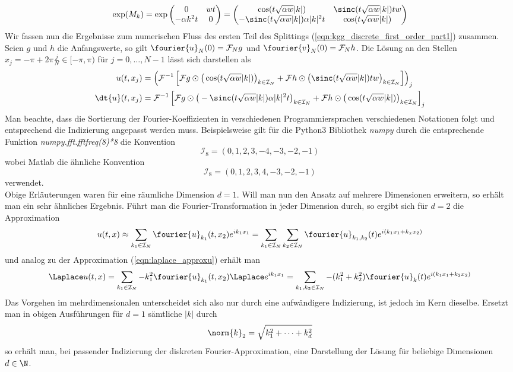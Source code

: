 \[\exp(M_k)=\exp\begin{pmatrix}0 & wt\\ -\alpha k^2t & 0\end{pmatrix}=
\begin{pmatrix}\cos(t\sqrt{\alpha w}|k|) & \sinc(t\sqrt{\alpha w}|k|)tw\\-\sinc(t\sqrt{\alpha w}|k|)\alpha |k|^2t & \cos(t\sqrt{\alpha w}|k|)\end{pmatrix}\]
Wir fassen nun die Ergebnisse zum numerischen Fluss des ersten Teil des Splittings (\ref{eqn:kgg_discrete_first_order_part1}) zusammen.\\
Seien $g$ und $h$ die Anfangswerte, so gilt $\fourier{u}_N(0)=\mathcal{F}_Ng$ und $\fourier{v}_N(0)=\mathcal{F}_Nh$. Die Lösung an den Stellen $x_j=-\pi+2\pi\frac{j}{N}\in [-\pi,\pi)$ für $j=0,\dots,N-1$ lässt sich darstellen als
\begin{align*}
u(t,x_j)&=\left(\mathcal{F}^{-1}\left[\mathcal{F}g\odot \big(\cos(t\sqrt{\alpha w}|k|)\big)_{k\in\mathcal{I}_N} + \mathcal{F}h\odot \big(\sinc(t\sqrt{\alpha w}|k|)tw\big)_{k\in\mathcal{I}_N}\right]\right)_j\\
\dt{u}(t,x_j)&=\mathcal{F}^{-1}\left[\mathcal{F}g \odot \big(-\sinc(t\sqrt{\alpha w}|k|)\alpha|k|^2t\big)_{k\in\mathcal{I}_N}+\mathcal{F}h\odot \big(\cos(t\sqrt{\alpha w}|k|)\big)_{k\in\mathcal{I}_N}\right]_j
\end{align*}
Man beachte, dass die Sortierung der Fourier-Koeffizienten in verschiedenen Programmiersprachen verschiedenen Notationen folgt und entsprechend die Indizierung angepasst werden muss. Beispielsweise gilt für die Python3 Bibliothek \emph{numpy} durch die entsprechende Funktion \emph{numpy.fft.fftfreq(8)*8} die Konvention
\[\mathcal{I}_8=\left( 0,  1,  2,  3, -4, -3, -2, -1\right)\]
wobei Matlab die ähnliche Konvention
\[\mathcal{I}_8=\left( 0,  1,  2,  3, 4, -3, -2, -1\right)\]
verwendet.\\[0.3cm]
Obige Erläuterungen waren für eine räumliche Dimension $d=1$. Will man nun den Ansatz auf mehrere Dimensionen erweitern, so erhält man ein sehr ähnliches Ergebnis.
Führt man die Fourier-Transformation in jeder Dimension durch, so ergibt sich für $d=2$ die Approximation
\[u(t,x)\approx\sum_{k_1\in\mathcal{I}_N}\fourier{u}_{k_1}(t,x_2)e^{ik_1x_1}=\sum_{k_1\in\mathcal{I}_N}\sum_{k_2\in\mathcal{I}_N}\fourier{u}_{k_1,k_2}(t)e^{i(k_1x_1+k_xx_2)}\]
und analog zu der Approximation (\ref{eqn:laplace_approxu}) erhält man
\[\Laplace u(t,x)=\sum_{k_1\in\mathcal{I}_N}-k_1^2\fourier{u}_{k_1}(t,x_2)\Laplace e^{ik_1x_1}=\sum_{k_1,k_2\in\mathcal{I}_N}-(k_1^2+k_2^2)\fourier{u}_k(t)e^{i(k_1x_1+k_2x_2)}\]
Das Vorgehen im mehrdimensionalen unterscheidet sich also nur durch eine aufwändigere Indizierung, ist jedoch im Kern dieselbe. Ersetzt man in obigen Ausführungen für $d=1$ sämtliche $|k|$ durch \[\norm{k}_2=\sqrt{k_1^2+\dots+k_d^2}\]so erhält man, bei passender Indizierung der diskreten Fourier-Approximation, eine Darstellung der Lösung für beliebige Dimensionen $d\in\N$.
